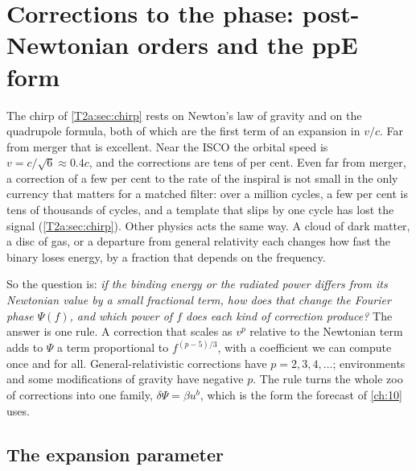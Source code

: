 \section{Corrections to the phase: post-Newtonian orders and the ppE form}
\label{T2g:sec:pn}

The chirp of \cref{T2a:sec:chirp} rests on Newton's law of gravity and on the quadrupole formula, both of which are the first term of an expansion in $v/c$. Far from merger that is excellent. Near the ISCO the orbital speed is $v=c/\sqrt6\approx0.4c$, and the corrections are tens of per cent. Even far from merger, a correction of a few per cent to the rate of the inspiral is not small in the only currency that matters for a matched filter: over a million cycles, a few per cent is tens of thousands of cycles, and a template that slips by one cycle has lost the signal (\cref{T2a:sec:chirp}). Other physics acts the same way. A cloud of dark matter, a disc of gas, or a departure from general relativity each changes how fast the binary loses energy, by a fraction that depends on the frequency.

So the question is: \emph{if the binding energy or the radiated power differs from its Newtonian value by a small fractional term, how does that change the Fourier phase $\Psi(f)$, and which power of $f$ does each kind of correction produce?} The answer is one rule. A correction that scales as $v^p$ relative to the Newtonian term adds to $\Psi$ a term proportional to $f^{(p-5)/3}$, with a coefficient we can compute once and for all. General-relativistic corrections have $p=2,3,4,\dots$; environments and some modifications of gravity have negative $p$. The rule turns the whole zoo of corrections into one family, $\delta\Psi=\beta u^b$, which is the form the forecast of \cref{ch:10} uses.

\subsection{The expansion parameter}

